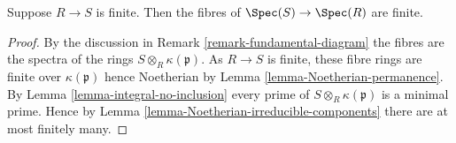 \begin{lemma}
\label{lemma-finite-finite-fibres}
Suppose $R \to S$ is finite.
Then the fibres of $\Spec(S) \to \Spec(R)$ are finite.
\end{lemma}

\begin{proof}
By the discussion in
Remark \ref{remark-fundamental-diagram}
the fibres are the spectra of the rings $S \otimes_R \kappa(\mathfrak p)$.
As $R \to S$ is finite, these fibre rings are finite over
$\kappa(\mathfrak p)$ hence Noetherian by
Lemma \ref{lemma-Noetherian-permanence}.
By
Lemma \ref{lemma-integral-no-inclusion}
every prime of $S \otimes_R \kappa(\mathfrak p)$ is a minimal
prime. Hence by
Lemma \ref{lemma-Noetherian-irreducible-components}
there are at most finitely many.
\end{proof}